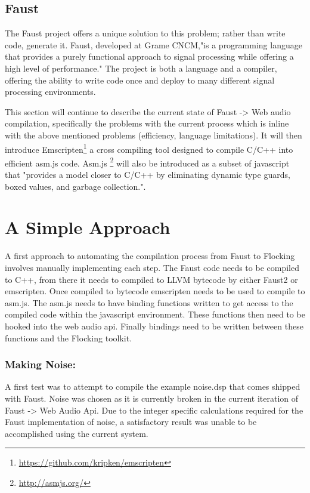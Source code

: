 \documentclass[runningheads,a4paper]{llncs}
\begin{document}
\subsection{Faust}
The Faust project offers a unique solution to this problem; rather than write code, generate it.  Faust, developed at Grame CNCM,"is a programming language that provides a purely functional approach to signal processing while offering a high level of performance." \cite{orlarey:09c}  The project is both a language and a compiler, offering the ability to write code once and deploy to many different signal processing environments.



This section will continue to describe the current state of Faust -> Web audio compilation, specifically the problems with the current process which is inline with the above mentioned problems (efficiency, language limitations).  It will then introduce Emscripten\footnote{\url{https://github.com/kripken/emscripten}} a cross compiling tool designed to compile C/C++ into efficient asm.js code.  Asm.js \footnote{\url{http://asmjs.org/}} will also be introduced as a subset of javascript that "provides a model closer to C/C++ by eliminating dynamic type guards, boxed values, and garbage collection."\cite{asm-js}.

\section{A Simple Approach}

A first approach to automating the compilation process from Faust to Flocking involves manually implementing each step. The Faust code needs to be compiled to C++, from there it needs to compiled to LLVM bytecode by either Faust2 or emscripten.  Once compiled to bytecode emscripten needs to be used to compile to asm.js.  The asm.js needs to have binding functions written to get access to the compiled code within the javascript environment.  These functions then need to be hooked into the web audio api.  Finally bindings need to be written between these functions and the Flocking toolkit.

\subsubsection{Making Noise:}

A first test was to attempt to compile the example noise.dsp that comes shipped with Faust.  Noise was chosen as it is currently broken in the current iteration of Faust -> Web Audio Api.  Due to the integer specific calculations required for the Faust implementation of noise, a satisfactory result was unable to be accomplished using the current system.
\end{document}
